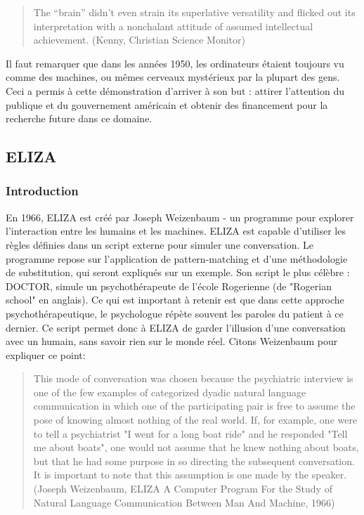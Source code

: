 \documentclass[11pt,a4paper]{report}
\begin{document}
  \begin{quote}
  The “brain” didn’t even strain its superlative versatility and flicked out its
  interpretation with a nonchalant attitude of assumed intellectual achievement. (Kenny,
  Christian Science Monitor)
  \end{quote}

  Il faut remarquer que dans les années 1950, les ordinateurs étaient toujours vu comme des machines, ou 
  mêmes cerveaux mystérieux par la plupart des gens. Ceci a permis à cette démonstration d'arriver à 
  son but : attirer l'attention du publique et du gouvernement américain et obtenir des financement pour 
  la recherche future dans ce domaine. 
  
  \subsection*{ELIZA}
  \subsubsection*{Introduction}
  En 1966, ELIZA est créé par Joseph Weizenbaum - un programme pour explorer l'interaction entre les humains et 
  les machines. ELIZA est capable d'utiliser les règles définies dans un script externe pour simuler 
  une conversation. Le programme repose sur l'application de pattern-matching et d'une 
  méthodologie de substitution, qui seront expliqués sur un exemple.
  Son script le plus célèbre : DOCTOR, simule un psychothérapeute de l'école Rogerienne
  (de "Rogerian school" en anglais). Ce qui est important à retenir est que dans cette approche 
  psychothérapeutique, le psychologue répète souvent les paroles du patient à ce dernier. 
  Ce script permet donc à ELIZA de garder l'illusion d'une conversation avec un humain, 
  sans savoir rien sur le monde réel. Citons Weizenbaum pour expliquer ce point:

  \begin{quote}
    This mode of conversation was chosen because the psychiatric interview is one of the 
    few examples of categorized dyadic natural 
    language communication in which one of the participating pair is free to assume the pose 
    of knowing almost nothing of the real world. If, for example, one were to tell a 
    psychiatrist "I went for a long boat ride" and he responded "Tell me about boats", 
    one would not assume that he knew nothing about boats, but that he had some purpose 
    in so directing the subsequent conversation. It is important to note that this 
    assumption is one made by the speaker. (Joseph Weizenbaum, ELIZA A Computer Program
    For the Study of Natural Language
    Communication Between Man
    And Machine, 1966)
  \end{quote} 
\end{document}
